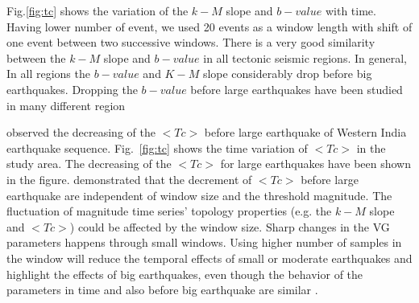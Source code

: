 \noindent 
Fig.\ref{fig:tc}  shows the variation of the $k-M$ slope and $b-value$ with time. Having lower number of event, we used 20 events as a window length with shift of one event between two successive windows. There is a very good similarity between the $k-M$ slope and $b-value$ in all tectonic seismic regions. In general, In all regions the $b-value$ and $K-M$ slope considerably drop before big earthquakes. Dropping the $b-value$ before large earthquakes have been studied in many different region \citep[e.g.][]{Wyss2000,Wyss2006,Schorlemmer2005,Chan2012}

\noindent
\citet{Telesca2016} observed the decreasing of the $<Tc>$ before large earthquake of Western India earthquake sequence. Fig.~\ref{fig:tc} shows the time variation of $<Tc>$ in the study area. The decreasing of the $<Tc>$ for large earthquakes have been shown in the figure. \citet{Telesca2016} demonstrated that the decrement of $<Tc>$ before large earthquake are independent of window size and the threshold magnitude. The fluctuation of magnitude time series' topology properties (e.g. the $k-M$ slope and $<Tc>$) could be affected by the window size. Sharp changes in the VG parameters happens through small windows. Using higher number of samples in the window will reduce the temporal effects of small or moderate earthquakes and highlight the effects of big earthquakes, even though the behavior of the parameters in time and also before big earthquake are similar \citep{Telesca2016}. %
 

